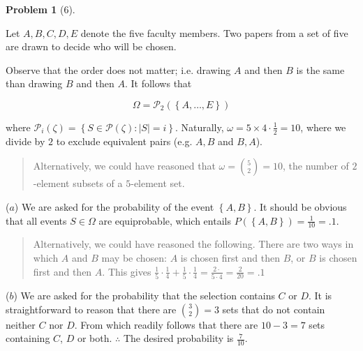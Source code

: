 \documentclass[a4paper, 12pt]{article}
\newtheorem{problem}{Problem}
\newtheorem{problem}{Problem}
\begin{document}
    \pagebreak 

    \begin{problem}[6]
        
    \end{problem}

    Let $A, B, C, D, E$ denote the five faculty members. Two papers from a set
    of five are drawn to decide who will be chosen. 

    Observe that the order does not matter; i.e. drawing $A$ and then $B$ is the 
    same than drawing $B$ and then $A$. It follows that 

    \begin{equation*}
        \Omega = \mathcal{P}_2(\left\{ A, \ldots, E \right\} )
    \end{equation*}

    where $\mathcal{P}_i(\zeta) = \left\{ S \in \mathcal{P}(\zeta) : |S| = i \right\} $.
    Naturally, $\omega = 5 \times 4 \cdot \frac{1}{2} = 10$, where we 
    divide by $2$ to exclude equivalent pairs (e.g. $A, B$ and $B, A$).

    
    \small
    \begin{quote}
    
    Alternatively, we could have reasoned that $\omega = \binom{5}{2} = 10$, the number 
    of $2$-element subsets of a $5$-element set.
    
    \end{quote}
    \normalsize

    ($a$) We are asked for the probability of the event $\left\{ A, B \right\} $. It 
    should be obvious that all events $S \in \Omega$ are equiprobable, 
    which entails $P(\left\{ A, B \right\}) = \frac{1}{10} = .1 $.

    
    \small
    \begin{quote}
    
    Alternatively, we could have reasoned the following. There are two ways in
    which $A$ and $B$ may be chosen: $A$ is chosen first and then $B$, or $B$
    is chosen first and then $A$. This gives $\frac{1}{5} \cdot \frac{1}{4} +
    \frac{1}{5} \cdot \frac{1}{4} = \frac{2 \cdot}{5\cdot4} = \frac{2}{20} =
    .1$
    
    \end{quote}
    \normalsize

    ($b$) We are asked for the probability that the selection contains $C$ or
    $D$. It is straightforward to reason that there are $\binom{3}{2} = 3$ sets
    that do not contain neither $C$ nor $D$. From which readily follows that 
    there are $10 - 3 = 7$ sets containing $C$, $D$ or both. $\therefore $
    The desired probability is $\frac{7}{10}$.
\end{document}
